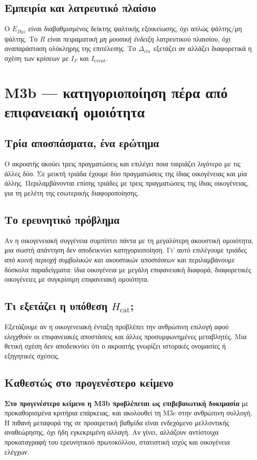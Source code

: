 \documentclass[11pt,a4paper]{extarticle}
\begin{document}
\subsection*{Εμπειρία και λατρευτικό πλαίσιο}
Ο \(E_{Byz}\) είναι διαβαθμισμένος δείκτης ψαλτικής εξοικείωσης, όχι απλώς ψάλτης/μη ψάλτης. Το \(R\) είναι πειραματική \emph{μη μουσική ένδειξη} λατρευτικού πλαισίου, όχι αναπαράσταση ολόκληρης της επιτέλεσης. Το \(\Delta_{ctx}\) εξετάζει αν αλλάζει διαφορετικά η σχέση των κρίσεων με \(I_F\) και \(I_{\mathrm{event}}\).


\section{M3b — κατηγοριοποίηση πέρα από επιφανειακή ομοιότητα}
\subsection*{Τρία αποσπάσματα, ένα ερώτημα}
Ο ακροατής ακούει τρεις πραγματώσεις και επιλέγει ποια ταιριάζει λιγότερο με τις άλλες δύο. Σε μεικτή τριάδα έχουμε δύο πραγματώσεις της ίδιας οικογένειας και μία άλλης. Περιλαμβάνονται επίσης τριάδες με τρεις πραγματώσεις της ίδιας οικογένειας, για τη μελέτη της εσωτερικής διαφοροποίησης.
\subsection*{Το ερευνητικό πρόβλημα}
Αν η οικογενειακή συγγένεια συμπίπτει πάντα με τη μεγαλύτερη ακουστική ομοιότητα, μια σωστή απάντηση δεν αποδεικνύει κατηγοριοποίηση. Γι' αυτό επιλέγουμε τριάδες από \emph{κοινή περιοχή συμβολικών και ακουστικών αποστάσεων} και περιλαμβάνουμε δύσκολα παραδείγματα: ίδια οικογένεια με μεγάλη επιφανειακή διαφορά, διαφορετικές οικογένειες με συγκρίσιμη επιφανειακή ομοιότητα.
\subsection*{Τι εξετάζει η υπόθεση \(H_{\mathrm{cat}}\);}
Εξετάζουμε αν η οικογενειακή ένταξη προβλέπει την ανθρώπινη επιλογή \emph{αφού ελεγχθούν} οι επιφανειακές αποστάσεις και άλλες προσυμφωνημένες μεταβλητές. Μια θετική σχέση δεν αποδεικνύει ότι ο ακροατής γνωρίζει ιστορικές ονομασίες ή εξηγητικές σχέσεις.
\subsection*{Καθεστώς στο προγενέστερο κείμενο}
\textbf{Στο προγενέστερο κείμενο η M3b προβλέπεται ως επιβεβαιωτική δοκιμασία} με προκαθορισμένα κριτήρια επάρκειας, και ακολουθεί τη M3c στην ανθρώπινη συλλογή. Η πιθανή μεταφορά της σε προαιρετική βαθμίδα είναι ενδεχόμενο μελλοντικής αναθεώρησης, όχι ήδη εγκεκριμένη αλλαγή. Αν γίνει, αλλάζουν αντίστοιχα προκαταγραφή του ερευνητικού πρωτοκόλλου, στατιστική ισχύς και οικογένεια ελέγχων.
\end{document}
